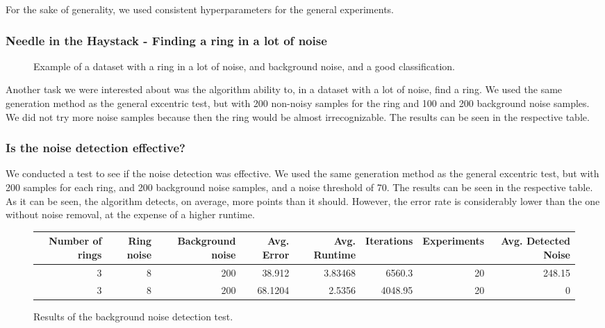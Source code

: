 \documentclass[conference]{IEEEtran}
\begin{document}
For the sake of generality, we used consistent hyperparameters for the general experiments.


\subsubsection{Needle in the Haystack - Finding a ring in a lot of noise}

\begin{figure}[H]
    \centering
    \resizebox{0.9\linewidth}{!}{}
    \label{fig:needle}
    \caption{Example of a dataset with a ring in a lot of noise, and background noise, and a good classification.}
\end{figure}

Another task we were interested about was the algorithm ability to, in a dataset with a lot of noise, find a ring. We used the same generation method as the general excentric test,
but with 200 non-noisy samples for the ring and 100 and 200 background noise samples. We did not try more noise samples because then the ring would be almost irrecognizable.
The results can be seen in the respective table.


\subsubsection{Is the noise detection effective?}
We conducted a test to see if the noise detection was effective. We used the same generation method as the general excentric test, but with 200 samples for each ring, and 200 background noise samples,
and a noise threshold of 70. The results can be seen in the respective table.
As it can be seen, the algorithm detects, on average, more points than it should. However, the error rate is considerably lower than the one without noise removal, at the expense of a higher runtime.


\begin{figure*}[!ht]
    \centering
    \begin{tabular}{rrrrrrrr}
        \hline
           Number of rings &   Ring noise &   Background noise &   Avg. Error &   Avg. Runtime &   Iterations &   Experiments &   Avg. Detected Noise \\
        \hline
                         3 &            8 &                200 &      38.912  &        3.83468 &      6560.3  &            20 &                248.15 \\
                         3 &            8 &                200 &      68.1204 &        2.5356  &      4048.95 &            20 &                  0    \\
        \hline
    \end{tabular}
    \caption{Results of the background noise detection test.}
\end{figure*}
\end{document}
